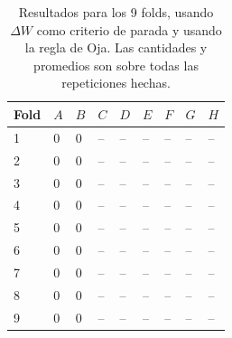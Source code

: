 \documentclass[informe.tex]{subfiles}
\begin{document}
	\begin{table}[H]
	  \centering
	  \begin{tabular}{|l|l|l|l|l|l|l|l|l|} \hline
	  Fold & $A$ & $B$ & $C$ & $D$ & $E$ & $F$ & $G$ & $H$ \\ \hline
	  1& 0 & 0 & -- & -- & -- & -- & -- & -- \\ \hline
	  2& 0 & 0 & -- & -- & -- & -- & -- & -- \\ \hline
	  3& 0 & 0 & -- & -- & -- & -- & -- & -- \\ \hline
	  4& 0 & 0 & -- & -- & -- & -- & -- & -- \\ \hline
	  5& 0 & 0 & -- & -- & -- & -- & -- & -- \\ \hline
	  6& 0 & 0 & -- & -- & -- & -- & -- & -- \\ \hline
	  7& 0 & 0 & -- & -- & -- & -- & -- & -- \\ \hline
	  8& 0 & 0 & -- & -- & -- & -- & -- & -- \\ \hline
	  9& 0 & 0 & -- & -- & -- & -- & -- & -- \\ \hline
	  \end{tabular}
	  \caption{Resultados para los 9 folds, usando $\Delta W$ como criterio de parada y usando la regla de Oja. Las cantidades y promedios son sobre todas las repeticiones hechas.}
	  \label{tab:pesos_oja}
	\end{table}            

	
\end{document}
